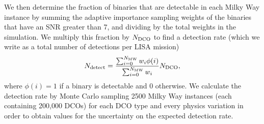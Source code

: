 We then determine the fraction of binaries that are detectable in each Milky Way instance by summing the adaptive importance sampling weights of the binaries that have an SNR greater than 7, and dividing by the total weights in the simulation. We multiply this fraction by $N_{\rm DCO}$ to find a detection rate (which we write as a total number of detections per LISA mission)
\begin{equation}
    N_{\rm detect} = \frac{\sum_{i = 0}^{N_{\rm MW}} w_i \phi(i)}{\sum_{i = 0}^{N_{\rm MW}} w_i} N_{\rm DCO},
\end{equation}
where $\phi(i) = 1$ if a binary is detectable and $0$ otherwise. We calculate the detection rate by Monte Carlo sampling 2500 Milky Way instances (each containing 200,000 DCOs) for each DCO type and every physics variation in order to obtain values for the uncertainty on the expected detection rate.